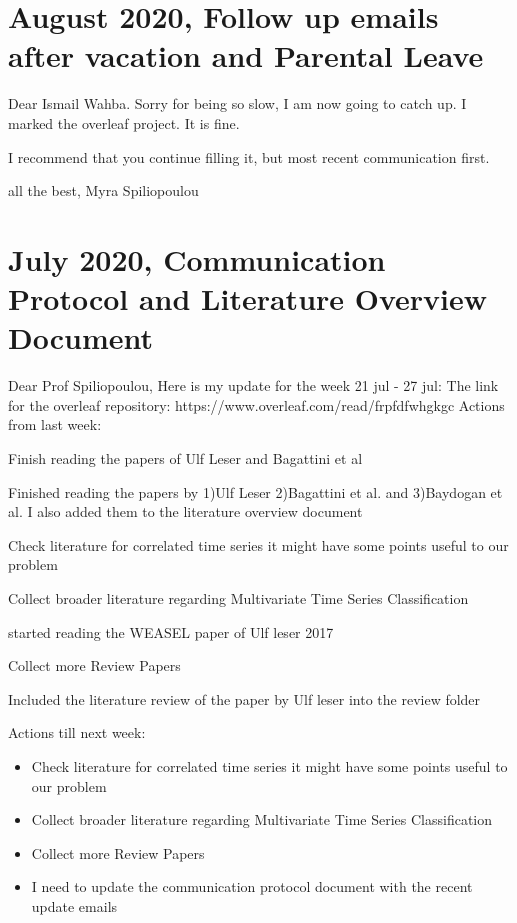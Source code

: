\documentclass{article}
\newcommand{\cmark}{\ding{51}}%
\newcommand{\done}{\rlap{$\square$}{\raisebox{2pt}{\large\hspace{1pt}\cmark}}%
\hspace{-2.5pt}}
\begin{document}
\section*{\texorpdfstring{}. August 2020, Follow up emails after vacation and Parental Leave}
Dear Ismail Wahba.
Sorry for being so slow, I am now going to catch up. I marked the overleaf project. It is fine.
	\begin{todolist}
		\item [\done] I recommend that you continue filling it, but most recent communication first.
	\end{todolist}
all the best,
Myra Spiliopoulou

\section*{\texorpdfstring{}. July 2020, Communication Protocol and Literature Overview Document}
Dear Prof Spiliopoulou,
Here is my update for the week 21 jul - 27 jul:
The link for the overleaf repository: https://www.overleaf.com/read/frpfdfwhgkgc
Actions from last week:
 \begin{todolist}
		\item [\done] Finish reading the papers of Ulf Leser and Bagattini et al
		\begin{todolist}
			\item [\done] Finished reading the papers by 1)Ulf Leser 2)Bagattini et al. and 3)Baydogan et al. I also added them to the literature overview document
		\end{todolist}
		\item Check literature for correlated time series it might have some points useful to our problem
		\item [\done] Collect broader literature regarding Multivariate Time Series Classification
			\begin{todolist}
				\item [\done] started reading the WEASEL paper of Ulf leser 2017
			\end{todolist}
		\item [\done] Collect more Review Papers
			\begin{todolist}
				\item [\done] Included the literature review of the paper by Ulf leser into the review folder
			\end{todolist}
\end{todolist}

Actions till next week:
\begin{itemize}
	\item Check literature for correlated time series it might have some points useful to our problem
	\item Collect broader literature regarding Multivariate Time Series Classification
	\item Collect more Review Papers
	\item I need to update the communication protocol document with the recent update emails
\end{itemize}
\end{document}
